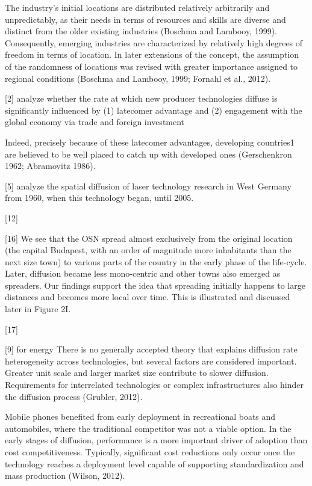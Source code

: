 \documentclass[10pt,letterpaper]{article}
\begin{document}
The industry's initial locations are distributed relatively arbitrarily
and unpredictably, as their needs in terms of resources and skills are
diverse and distinct from the older existing industries (Boschma and
Lambooy, 1999). Consequently, emerging industries are characterized by
relatively high degrees of freedom in terms of location. In later
extensions of the concept, the assumption of the randomness of locations
was revised with greater importance assigned to regional conditions
(Boschma and Lambooy, 1999; Fornahl et al., 2012).

{[}2{]} analyze whether the rate at which new producer technologies
diffuse is significantly influenced by (1) latecomer advantage and (2)
engagement with the global economy via trade and foreign investment

Indeed, precisely because of these latecomer advantages, developing
countries1 are believed to be well placed to catch up with developed
ones (Gerschenkron 1962; Abramovitz 1986).

{[}5{]} analyze the spatial diffusion of laser technology research in
West Germany from 1960, when this technology began, until 2005.

{[}12{]}

{[}16{]} We see that the OSN spread almost exclusively from the original
location (the capital Budapest, with an order of magnitude more
inhabitants than the next size town) to various parts of the country in
the early phase of the life-cycle. Later, diffusion became less
mono-centric and other towns also emerged as spreaders. Our findings
support the idea that spreading initially happens to large distances and
becomes more local over time. This is illustrated and discussed later in
Figure 2I.

{[}17{]}

{[}9{]} for energy There is no generally accepted theory that explains
diffusion rate heterogeneity across technologies, but several factors
are considered important. Greater unit scale and larger market size
contribute to slower diffusion. Requirements for interrelated
technologies or complex infrastructures also hinder the diffusion
process (Grubler, 2012).

Mobile phones benefited from early deployment in recreational boats and
automobiles, where the traditional competitor was not a viable option.
In the early stages of diffusion, performance is a more important driver
of adoption than cost competitiveness. Typically, significant cost
reductions only occur once the technology reaches a deployment level
capable of supporting standardization and mass production (Wilson,
2012).
\end{document}
